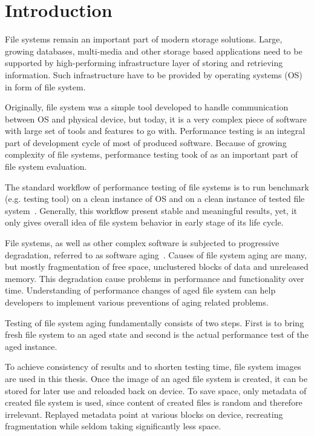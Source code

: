 \documentclass[
  color, %
  table, %
  lof,   %
  lot,   %
]{fithesis3}
\begin{document}
\chapter{Introduction}
File systems remain an important part of modern storage solutions.  Large, growing databases, multi-media and other storage based applications need to be supported by high-performing infrastructure layer of storing and retrieving information. Such infrastructure have to be provided by operating systems (OS) in form of file system.

Originally, file system was a simple tool developed to handle communication between OS and physical device, but today, it is a very complex piece of software with large set of tools and features to go with. Performance testing is an integral part of development cycle of most of produced software. Because of growing complexity of file systems, performance testing took of as an important part of file system evaluation.

The standard workflow of performance testing of file systems is to run benchmark (e.g. testing tool) on a clean instance of OS and on a clean instance of tested file system~\cite{Traeger:2008:NYS:1367829.1367831}. Generally, this workflow present stable and meaningful results, yet, it only gives overall idea of file system behavior in early stage of its life cycle. 

File systems, as well as other complex software is subjected to progressive degradation, referred to as software aging~\cite{Cotroneo:2014:SSA:2543749.2539117}. Causes of file system aging are many, but mostly fragmentation of free space, unclustered blocks of data and unreleased memory. This degradation cause problems in performance and functionality over time. Understanding of performance changes of aged file system can help developers to implement various preventions of aging related problems.

Testing of file system aging fundamentally consists of two steps. First is to bring fresh file system to an aged state and second is the actual performance test of the aged instance.

To achieve consistency of results and to shorten testing time, file system images are used in this thesis. Once the image of an aged file system is created, it can be stored for later use and reloaded back on device. To save space, only metadata of created file system is used, since content of created files is random and therefore irrelevant. Replayed metadata point at various blocks on device, recreating fragmentation while seldom taking significantly less space.
\end{document}
